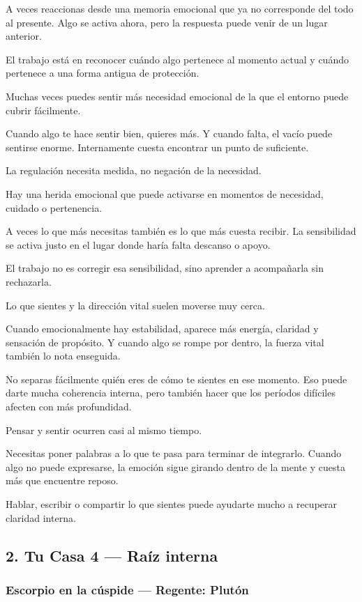 \documentclass[11pt,a4paper]{article}
\begin{document}
A veces reaccionas desde una memoria emocional que ya no corresponde del todo al presente. Algo se activa ahora, pero la respuesta puede venir de un lugar anterior.

El trabajo está en reconocer cuándo algo pertenece al momento actual y cuándo pertenece a una forma antigua de protección.

Muchas veces puedes sentir más necesidad emocional de la que el entorno puede cubrir fácilmente.

Cuando algo te hace sentir bien, quieres más. Y cuando falta, el vacío puede sentirse enorme. Internamente cuesta encontrar un punto de suficiente.

La regulación necesita medida, no negación de la necesidad.

Hay una herida emocional que puede activarse en momentos de necesidad, cuidado o pertenencia.

A veces lo que más necesitas también es lo que más cuesta recibir. La sensibilidad se activa justo en el lugar donde haría falta descanso o apoyo.

El trabajo no es corregir esa sensibilidad, sino aprender a acompañarla sin rechazarla.

Lo que sientes y la dirección vital suelen moverse muy cerca.

Cuando emocionalmente hay estabilidad, aparece más energía, claridad y sensación de propósito. Y cuando algo se rompe por dentro, la fuerza vital también lo nota enseguida.

No separas fácilmente quién eres de cómo te sientes en ese momento. Eso puede darte mucha coherencia interna, pero también hacer que los períodos difíciles afecten con más profundidad.

Pensar y sentir ocurren casi al mismo tiempo.

Necesitas poner palabras a lo que te pasa para terminar de integrarlo. Cuando algo no puede expresarse, la emoción sigue girando dentro de la mente y cuesta más que encuentre reposo.

Hablar, escribir o compartir lo que sientes puede ayudarte mucho a recuperar claridad interna.

\subsection{2. Tu Casa 4 — Raíz interna}

\subsubsection*{Escorpio en la cúspide — Regente: Plutón}
\end{document}
